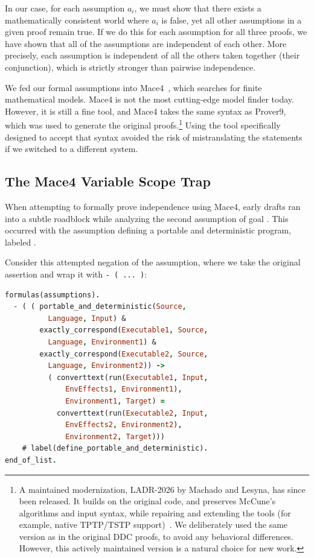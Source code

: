 In our case, for each assumption $a_i$, we must show that there exists a mathematically consistent world where $a_i$ is false, yet all other assumptions in a given proof remain true. If we do this for each assumption for all three proofs, we have shown that all of the assumptions are independent of each other. More precisely, each assumption is independent of all the others taken together (their conjunction), which is strictly stronger than pairwise independence.

We fed our formal assumptions into Mace4~\cite{mccune2009prover9}, which searches for finite mathematical models. Mace4 is not the most cutting-edge model finder today. However, it is still a fine tool, and Mace4 takes the same syntax as Prover9, which was used to generate the original proofs.\footnote{A maintained modernization, LADR-2026 by Machado and Lesyna, has since been released. It builds on the original code, and preserves McCune's algorithms and input syntax, while repairing and extending the tools (for example, native TPTP/TSTP support)~\cite{machado2026ladr}. We deliberately used the same version as in the original DDC proofs, to avoid any behavioral differences. However, this actively maintained version is a natural choice for new work.} Using the tool specifically designed to accept that syntax avoided the risk of mistranslating the statements if we switched to a different system.

\subsection{The Mace4 Variable Scope Trap}

When attempting to formally prove independence using Mace4, early drafts ran into a subtle roadblock while analyzing the second assumption of goal . This occurred with the assumption defining a portable and deterministic program, labeled .

Consider this attempted negation of the assumption, where we take the original assertion and wrap it with \texttt{- ( ... )}:

\noindent
\begin{minipage}{\columnwidth}
\begin{lstlisting}[language=Prolog, caption={An attempted negation that wraps the assumption in \texttt{- ( ... )}, which Mace4 misinterprets.}]
formulas(assumptions).
  - ( ( portable_and_deterministic(Source,
          Language, Input) &
        exactly_correspond(Executable1, Source,
          Language, Environment1) &
        exactly_correspond(Executable2, Source,
          Language, Environment2)) ->
          ( converttext(run(Executable1, Input,
              EnvEffects1, Environment1),
              Environment1, Target) =
            converttext(run(Executable2, Input,
              EnvEffects2, Environment2),
              Environment2, Target)))
    # label(define_portable_and_deterministic).
end_of_list.
\end{lstlisting}
\end{minipage}

